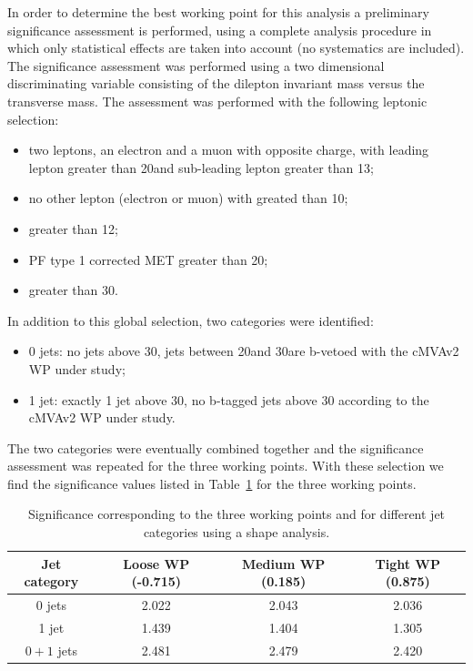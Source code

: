 In order to determine the best working point for this analysis a preliminary significance assessment is performed, using a complete analysis procedure in which only statistical
effects are taken into account (no systematics are included). The significance assessment
was performed using a two dimensional discriminating
variable consisting of the dilepton invariant mass versus the transverse
mass. The assessment was performed with the following leptonic selection:
\begin{itemize}
\item two leptons, an electron and a muon with opposite charge, with
leading lepton \pt greater than 20\GeV and sub-leading lepton \pt greater than
13\GeV;
\item no other lepton (electron or muon) with \pt greated than 10\GeV;
\item \mll greater than 12\GeV;
\item PF type 1 corrected MET greater than 20\GeV;
\item \ptll greater than 30\GeV.
\end{itemize}
In addition to this global selection, two categories were identified:
\begin{itemize}
\item 0 jets: no jets above 30\GeV, jets between 20\GeV and 30\GeV are
b-vetoed with the cMVAv2 WP under study;
\item 1 jet: exactly 1 jet above 30\GeV, no b-tagged jets above 30\GeV
according to the cMVAv2 WP under study.
\end{itemize}
The two categories were eventually combined together and the significance 
assessment was repeated for the three working points.
With these selection we find the significance values listed in
Table~\ref{tab:significance_wp_combine} for the three working points.
\begin{table}
\caption{Significance corresponding to the three working points and for
different jet categories using a shape
analysis.\label{tab:significance_wp_combine}}
\begin{center}
\begin{tabular}{cccc}
\toprule
Jet category & Loose WP (-0.715) & Medium WP (0.185) & Tight WP (0.875) \\
\midrule
0 jets & 2.022 & 2.043 & 2.036 \\
1 jet & 1.439 & 1.404 & 1.305 \\
$0+1$ jets & 2.481 & 2.479 & 2.420 \\
\bottomrule
\end{tabular}
\end{center}
\end{table}

